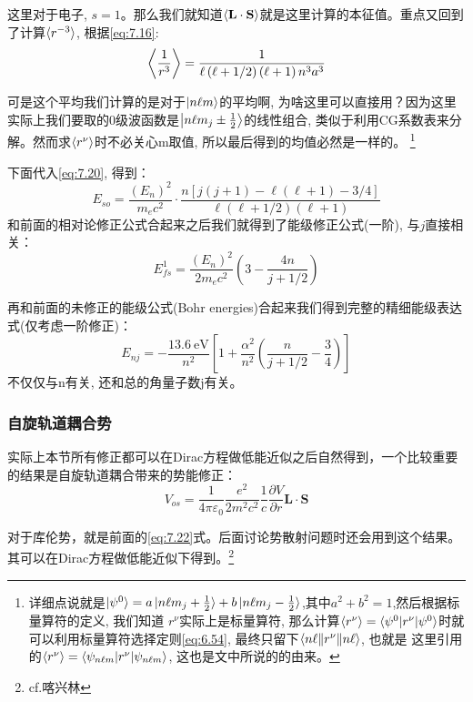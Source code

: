 \documentclass[a4paper,zihao=-4,linespread=1]{ctexrep}
\begin{document}
    这里对于电子, $s=1$。那么我们就知道$\braket{\mathbf{L}\cdot\mathbf{S}}$就是这里计算的本征值。重点又回到了计算$\braket{r^{-3}}$, 根据\ref{eq:7.16}:
    \[\Braket{\frac{1}{r^3}}=\frac{1}{\ell\left(\ell+1/2\right)\left(\ell+1\right)n^3a^3}\]
    
    可是这个平均我们计算的是对于$\ket{n\ell m}$的平均啊, 为啥这里可以直接用？因为这里实际上我们要取的0级波函数是$\Ket{n\ell m_j\pm\frac{1}{2}}$的线性组合,
    类似于利用CG系数表来分解。然而求$\braket{r^\nu}$时不必关心m取值, 所以最后得到的均值必然是一样的。
    \footnote{详细点说就是$\ket{\psi^0}=a\ket{n\ell m_j+\frac{1}{2}}+b\ket{n\ell m_j-\frac{1}{2}}$,其中$a^2+b^2=1$,然后根据标量算符的定义, 我们知道
    $r^\nu$实际上是标量算符, 那么计算$\braket{r^\nu}=\braket{\psi^0|r^\nu|\psi^0}$时就可以利用标量算符选择定则\ref{eq:6.54}, 最终只留下$\braket{n\ell\|r^\nu\|n\ell}$, 也就是
    这里引用的$\braket{r^\nu}=\braket{\psi_{n\ell m}|r^\nu|\psi_{n\ell m}}$, 这也是文中所说的的由来。}

    下面代入\ref{eq:7.20}, 得到：
    \[E_{so}=\frac{(E_n)^2}{m_ec^2}\cdot\frac{n\left[j\left(j+1\right)-\ell\left(\ell+1\right)-3/4\right]}{\ell(\ell+1/2)(\ell+1)}\]
    和前面的相对论修正公式合起来之后我们就得到了能级修正公式(一阶), 与$j$直接相关：
    \begin{equation}
        E^1_{fs}=\frac{(E_n)^2}{2m_ec^2}\left(3-\frac{4n}{j+1/2}\right)
    \end{equation}
    
    再和前面的未修正的能级公式(Bohr energies)合起来我们得到完整的精细能级表达式(仅考虑一阶修正)：
    \begin{equation}
        \label{eq:7.23}
        \boxed{E_{nj}=-\frac{\SI{13.6}{\electronvolt}}{n^2}\left[1+\frac{\alpha^2}{n^2}\left(\frac{n}{j+1/2}-\frac{3}{4}\right)\right]}
    \end{equation}
    不仅仅与n有关, 还和总的角量子数j有关。
    \subsubsection{自旋轨道耦合势}
  	实际上本节所有修正都可以在Dirac方程做低能近似之后自然得到，一个比较重要的结果是自旋轨道耦合带来的势能修正：
  	\begin{equation}
  		V_{os}=\frac{1}{4\pi\varepsilon_0}\frac{e^2}{2m^2c^2}\frac{1}{c}\frac{\partial V}{\partial r}\mathbf{L}\cdot\mathbf{S}
  	\end{equation}
  	
  	对于库伦势，就是前面的\ref{eq:7.22}式。后面讨论势散射问题时还会用到这个结果。其可以在Dirac方程做低能近似下得到。\footnote{cf.喀兴林}
    
\end{document}
